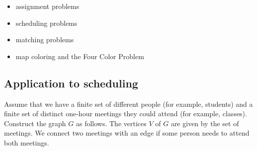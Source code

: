 \begin{itemize}
\item assignment problems

\item scheduling problems

\item matching problems

\item map coloring and the Four Color Problem
\end{itemize}


\subsection{Application to scheduling}

Assume that we have a finite set of different people (for example, students)
and a finite set of distinct one-hour meetings they could attend (for example,
classes). Construct the
graph $G$ as follows. The vertices $V$ of $G$ are given by the set of
meetings. We connect two meetings with an edge if some person
needs to attend both meetings.


